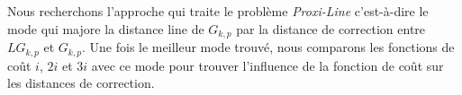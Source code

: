 Nous recherchons l'approche qui traite le probl\`eme {\em Proxi-Line} c'est-\`a-dire le mode qui majore la distance line de $G_{k,p}$ par la distance de correction entre $LG_{k,p}$ et $G_{k,p}$.
Une fois le meilleur mode trouv\'e, nous comparons les fonctions de co\^ut $i$, $2i$ et $3i$ avec ce mode pour trouver l'influence de la fonction de co\^ut sur les distances de correction.


